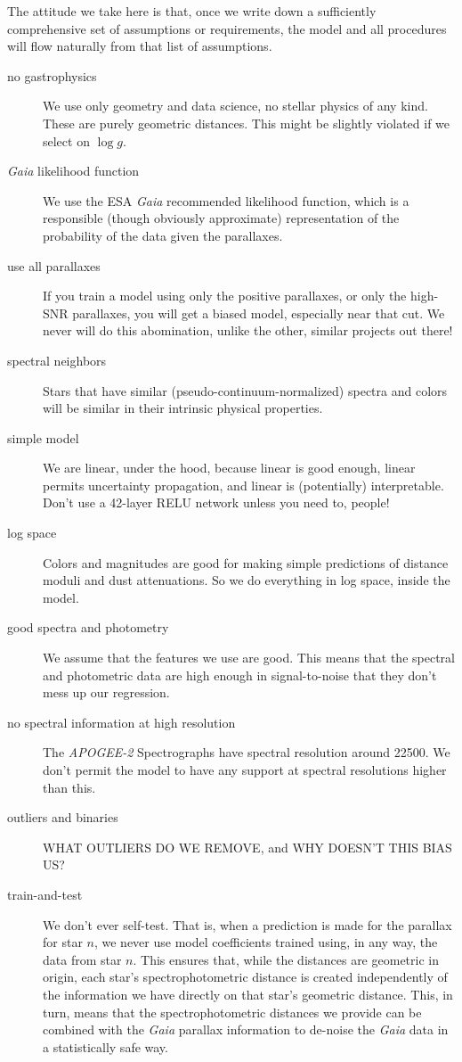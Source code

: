 \documentclass[modern]{aastex631}
\newcommand{\acronym}[1]{{\small{#1}}}
\newcommand{\project}[1]{\textsl{#1}}
\newcommand{\ESA}{\acronym{ESA}}
\newcommand{\Gaia}{\project{Gaia}}
\newcommand{\APOGEE}{\project{\acronym{APOGEE-2}}}
\begin{document}
The attitude we take here is that, once we write down a sufficiently comprehensive set of
assumptions or requirements, the model and all procedures will flow naturally from that list of assumptions.
\begin{description}
\item[no gastrophysics] We use only geometry and data science, no stellar physics
  of any kind. These are purely geometric distances. This might be slightly
  violated if we select on $\log g$.
\item[\Gaia{} likelihood function] We use the \ESA{} \Gaia{}
  recommended likelihood function, which is a responsible (though obviously
  approximate) representation of the probability of the data given the
  parallaxes.
\item[use all parallaxes] If you train a model using only the positive
  parallaxes, or only the high-SNR parallaxes, you will get a biased model,
  especially near that cut. We never will do this abomination, unlike the
  other, similar projects out there!
\item[spectral neighbors] Stars that have similar (pseudo-continuum-normalized) spectra and colors will be similar in
  their intrinsic physical properties.
\item[simple model] We are linear, under the hood, because linear is good enough,
  linear permits uncertainty propagation, and linear is (potentially) interpretable. Don't use
  a 42-layer RELU network unless you need to, people!
\item[log space] Colors and magnitudes are good for making simple predictions of distance moduli and
  dust attenuations. So we do everything in log space, inside the model.
\item[good spectra and photometry] We assume that the features we use are
  good. This means that the spectral and photometric data are high enough in
  signal-to-noise that they don't mess up our regression.
\item[no spectral information at high resolution] The \APOGEE{} Spectrographs
  have spectral resolution around 22500. We don't permit the model to have any
  support at spectral resolutions higher than this.
\item[outliers and binaries] WHAT OUTLIERS DO WE REMOVE, and WHY DOESN'T THIS BIAS US?
\item[train-and-test] We don't ever self-test. That is, when a prediction is
  made for the parallax for star $n$, we never use model coefficients trained
  using, in any way, the data from star $n$.
  This ensures that, while the distances are geometric in origin, each star's
  spectrophotometric distance is created
  independently of the information we have directly on that star's
  geometric distance. This, in turn, means that the spectrophotometric distances
  we provide can be combined with the \Gaia{} parallax information to de-noise
  the \Gaia{} data in a statistically safe way.
\end{description}
\end{document}
